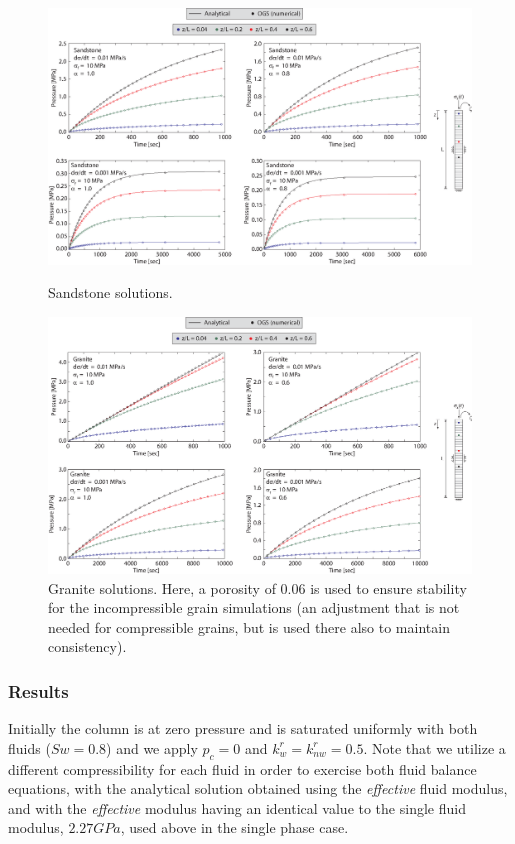 \begin{figure}[!tbh]
\begin{center}
\includegraphics[width=1.0\textwidth]{chapter_14/figures/fig_14_3_21}
\end{center}
\caption{Sandstone solutions.}
\label{terz:h2msand}
\begin{center}
\includegraphics[width=1.0\textwidth]{chapter_14/figures/fig_14_3_22}
\end{center}
\caption{Granite solutions. Here, a porosity of 0.06 is used to ensure stability for the incompressible grain simulations (an adjustment that is not needed for compressible grains, but is used there also to maintain consistency).}
\label{terz:h2mgranite}
\end{figure}

\subsubsection*{Results}
Initially the column is at zero pressure and is saturated uniformly with both fluids ($Sw=0.8$) and we apply $p_c=0$ and $k^{r}_{w}=k^{r}_{nw}=0.5$. Note that we utilize a different compressibility for each fluid in order to exercise both fluid balance equations, with the analytical solution obtained using the \textit{effective} fluid modulus, and with the \textit{effective} modulus having an identical value to the single fluid modulus, $2.27 GPa$, used above in the single phase case.

